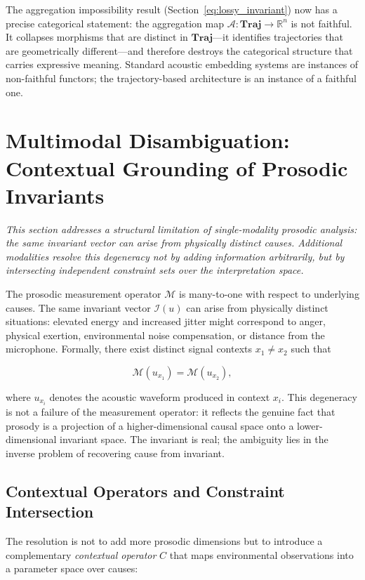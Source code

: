 \documentclass[12pt, a4paper]{article}
\begin{document}
The aggregation impossibility result (Section~\ref{eq:lossy_invariant}) now has a precise categorical statement: the aggregation map $\mathcal{A} : \mathbf{Traj} \to \mathbb{R}^n$ is not faithful. It collapses morphisms that are distinct in $\mathbf{Traj}$---it identifies trajectories that are geometrically different---and therefore destroys the categorical structure that carries expressive meaning. Standard acoustic embedding systems are instances of non-faithful functors; the trajectory-based architecture is an instance of a faithful one.


\section{Multimodal Disambiguation: Contextual Grounding of Prosodic Invariants}

\noindent\textit{This section addresses a structural limitation of single-modality prosodic analysis: the same invariant vector can arise from physically distinct causes. Additional modalities resolve this degeneracy not by adding information arbitrarily, but by intersecting independent constraint sets over the interpretation space.}

The prosodic measurement operator $\mathcal{M}$ is many-to-one with respect to underlying causes. The same invariant vector $\mathcal{I}(u)$ can arise from physically distinct situations: elevated energy and increased jitter might correspond to anger, physical exertion, environmental noise compensation, or distance from the microphone. Formally, there exist distinct signal contexts $x_1 \neq x_2$ such that

\begin{equation}
\mathcal{M}(u_{x_1}) = \mathcal{M}(u_{x_2}),
\label{eq:degeneracy}
\end{equation}

where $u_{x_i}$ denotes the acoustic waveform produced in context $x_i$. This degeneracy is not a failure of the measurement operator: it reflects the genuine fact that prosody is a projection of a higher-dimensional causal space onto a lower-dimensional invariant space. The invariant is real; the ambiguity lies in the inverse problem of recovering cause from invariant.

\subsection{Contextual Operators and Constraint Intersection}

The resolution is not to add more prosodic dimensions but to introduce a complementary \emph{contextual operator} $C$ that maps environmental observations into a parameter space over causes:
\end{document}
